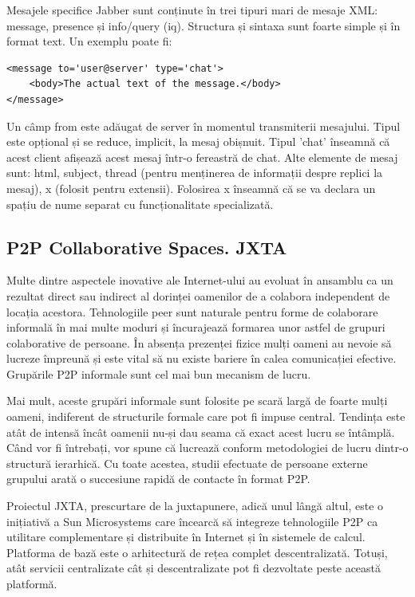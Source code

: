 Mesajele specifice Jabber sunt conținute în trei tipuri mari de mesaje XML:
message, presence și info/query (iq). Structura și sintaxa sunt foarte simple
și în format text. Un exemplu poate fi:

\begin{verbatim}
<message to='user@server' type='chat'>
    <body>The actual text of the message.</body>
</message>
\end{verbatim}

Un câmp from este adăugat de server în momentul transmiterii mesajului. Tipul
este opțional și se reduce, implicit, la mesaj obișnuit. Tipul 'chat' înseamnă
că acest client afișează acest mesaj într-o fereastră de chat. Alte elemente
de mesaj sunt: html, subject, thread (pentru menținerea de informații despre
replici la mesaj), x (folosit pentru extensii). Folosirea x înseamnă că se va
declara un spațiu de nume separat cu funcționalitate specializată.

\subsection{P2P Collaborative Spaces. JXTA}

Multe dintre aspectele inovative ale Internet-ului au evoluat în ansamblu ca
un rezultat direct sau indirect al dorinței oamenilor de a colabora
independent de locația acestora. Tehnologiile peer sunt naturale pentru forme
de colaborare informală în mai multe moduri și încurajează formarea unor
astfel de grupuri colaborative de persoane. În absența prezenței fizice mulți
oameni au nevoie să lucreze împreună și este vital să nu existe bariere în
calea comunicației efective. Grupările P2P informale sunt cel mai bun mecanism
de lucru.

Mai mult, aceste grupări informale sunt folosite pe scară largă de foarte
mulți oameni, indiferent de structurile formale care pot fi impuse central.
Tendința este atât de intensă încât oamenii nu-și dau seama că exact acest
lucru se întâmplă. Când vor fi întrebați, vor spune că lucrează conform
metodologiei de lucru dintr-o structură ierarhică. Cu toate acestea, studii
efectuate de persoane externe grupului arată o succesiune rapidă de contacte
în format P2P.

Proiectul JXTA, prescurtare de la juxtapunere, adică unul lângă altul, este o
inițiativă a Sun Microsystems care încearcă să integreze tehnologiile P2P ca
utilitare complementare și distribuite în Internet și în sistemele de calcul.
Platforma de bază este o arhitectură de rețea complet descentralizată. Totuși,
atât servicii centralizate cât și descentralizate pot fi dezvoltate peste
această platformă.

